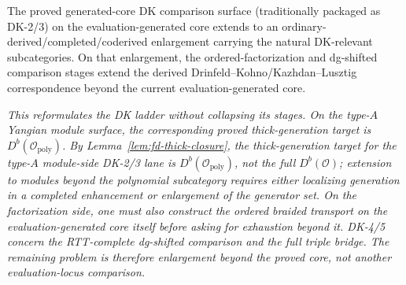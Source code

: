 \begin{conjecture}
\label{conj:master-dk-kl}
\ClaimStatusConjectured{}
The proved generated-core DK comparison surface
\textup{(}traditionally packaged as DK-2/3\textup{)} on the
evaluation-generated core
extends to an
ordinary-derived/completed/coderived enlargement carrying the natural
DK-relevant subcategories. On that enlargement, the ordered-factorization
and dg-shifted comparison stages extend the derived
Drinfeld--Kohno/Kazhdan--Lusztig correspondence beyond the current
evaluation-generated core.

\emph{This reformulates the DK ladder without collapsing its stages.
On the type-$A$ Yangian module surface, the corresponding proved
thick-generation target is
$D^b(\mathcal{O}_{\mathrm{poly}})$.
By Lemma~\textup{\ref{lem:fd-thick-closure}}, the thick-generation
target for the type-$A$ module-side DK-2/3 lane is
$D^b(\mathcal{O}_{\mathrm{poly}})$, not the
full $D^b(\mathcal{O})$; extension to modules beyond the polynomial
subcategory requires either localizing generation in a completed
enhancement or enlargement of the generator set. On the
factorization side, one must also construct the ordered braided
transport on the evaluation-generated core itself before asking for
exhaustion beyond it. DK-4/5 concern the
RTT-complete dg-shifted comparison and the full triple bridge. The
remaining problem is therefore enlargement beyond the proved core, not
another evaluation-locus comparison.}
\end{conjecture}

